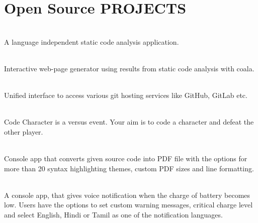 \documentclass[]{deedy-resume-openfont}
\begin{document}
\begin{minipage}[t]{0.66\textwidth}

\section{Open Source PROJECTS}

\\
A language independent static code analysis application. \textbf{\href{https://github.com/coala/coala}{ }}
\sectionsep

\\
Interactive web-page generator using results from static code analysis with coala.
\textbf{\href{https://github.com/coala/coala-html}{ }}
\sectionsep

\\
Unified interface to access various git hosting services like GitHub, GitLab etc.
\textbf{\href{https://gitlab.com/gitmate/IGitt/}{ }}
\sectionsep

\\
Code Character is a versus event. Your aim is to code a character and defeat the other player.
\textbf{\href{https://github.com/ash7594/code-control}{}}
\sectionsep

\\
Console app that converts given source code into PDF file with the options for more than 20 syntax highlighting themes, custom PDF sizes and line formatting. \textbf{\href{https://github.com/tushar-rishav/code2pdf}{}}
\sectionsep

\\
A console app, that gives voice notification when the charge of battery becomes low. Users have the options to set custom warning messages, critical charge level and select English, Hindi or Tamil as one of the notification languages. \textbf{\href{https://github.com/tushar-rishav/balert}{}}
\sectionsep



\end{minipage}
\end{document}
